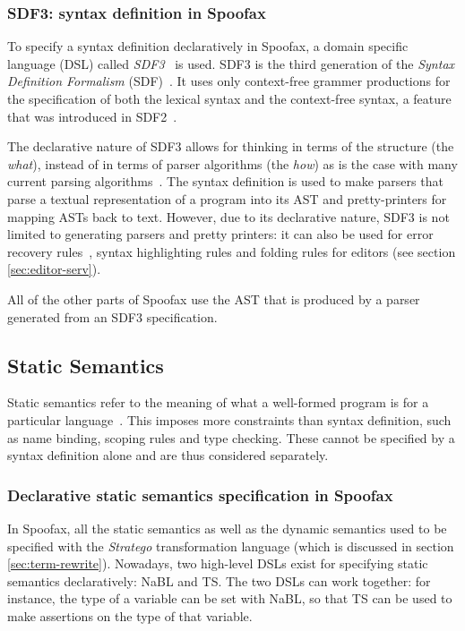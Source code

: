 \subsubsection{SDF3: syntax definition in Spoofax}
\label{sec:orgheadline1}
To specify a syntax definition declaratively in Spoofax, a domain
specific language (DSL) called \emph{SDF3}~\cite{Vollebregt12} is used.
SDF3 is the third generation of the \emph{Syntax Definition Formalism}
(SDF)~\cite{Heering89}. It uses only context-free grammer
productions for the specification of both the lexical syntax and the
context-free syntax, a feature that was introduced in
SDF2~\cite{Visser97}.

The declarative nature of SDF3 allows for thinking in terms of the
structure (the \emph{what}), instead of in terms of parser algorithms (the
\emph{how}) as is the case with many current parsing
algorithms~\cite{Kats10b}. The syntax definition is used to make
parsers that parse a textual representation of a program into its AST
and pretty-printers for mapping ASTs back to text. However, due to its
declarative nature, SDF3 is not limited to generating parsers and
pretty printers: it can also be used for error recovery
rules~\cite{deJonge12}, syntax highlighting rules and folding
rules for editors (see section \ref{sec:editor-serv}).

All of the other parts of Spoofax use the AST that is produced by a
parser generated from an SDF3 specification.
\subsection{Static Semantics}
\label{sec:static-analysis}
Static semantics refer to the meaning of what a well-formed program is
for a particular language~\cite{Milner97}. This imposes more
constraints than syntax definition, such as name binding, scoping
rules and type checking. These cannot be specified by a syntax
definition alone and are thus considered separately.
\subsubsection{Declarative static semantics specification in Spoofax}
\label{sec:orgheadline2}
In Spoofax, all the static semantics as well as the dynamic semantics
used to be specified with the \emph{Stratego} transformation language
(which is discussed in section \ref{sec:term-rewrite}). Nowadays, two
high-level DSLs exist for specifying static semantics declaratively:
NaBL and TS. The two DSLs can work together: for instance, the type of
a variable can be set with NaBL, so that TS can be used to make
assertions on the type of that variable.
